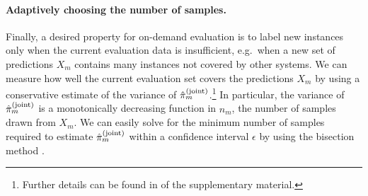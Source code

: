 \paragraph{Adaptively choosing the number of samples.}
Finally, a desired property for on-demand evaluation is to label new instances only when the current evaluation data is insufficient,
e.g.\ when a new set of predictions $X_m$ contains many instances not covered by other systems.
We can measure how well the current evaluation set covers the predictions $X_m$ by using a conservative estimate of the variance of ${\hat{\pi}}_m^{\text{(joint)}}$.\footnote{Further details can be found in  of the supplementary material.}
In particular, the variance of ${\hat{\pi}}_m^{\text{(joint)}}$ is a monotonically decreasing function in $n_m$, the number of samples drawn from $X_m$.
We can easily solve for the minimum number of samples required to estimate ${\hat{\pi}}_m^{\text{(joint)}}$ within a confidence interval $\epsilon$ by using the bisection method \citep{burden1985bisection}.
